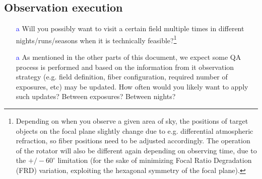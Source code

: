 \documentclass[a4paper,notitlepage]{article}
\newcommand{\colm}[1]{\textcolor{yellow}{#1}}
\newcommand{\coll}[1]{\textcolor{blue}{#1}}
\begin{document}
%
%

\subsection{Observation execution}

\begin{enumerate}
  \item[\coll{a}] Will you possibly want to visit a certain field
           multiple times in different nights/runs/seasons when it
           is technically feasible?\footnote{Depending on when you
           observe a given area of sky, the positions of target
           objects on the focal plane slightly change due to
           e.g. differential atmospheric refraction, so fiber
           positions need to be adjusted accordingly. The operation
           of the rotator will also be different again depending on
           observing time, due to the $+/-60^{\circ}$ limitation
           (for the sake of minimizing Focal Ratio Degradation (FRD)
           variation, exploiting the hexagonal symmetry of the focal
           plane).}
  \item[\coll{a}] As mentioned in the other parts of this document, we
           expect some QA process is performed and based on the
           information from it observation strategy (e.g. field
           definition, fiber configuration, required number of
           exposures, etc) may be updated. How often would you
           likely want to apply such updates? Between exposures?
           Between nights?
\end{enumerate}
\end{document}
